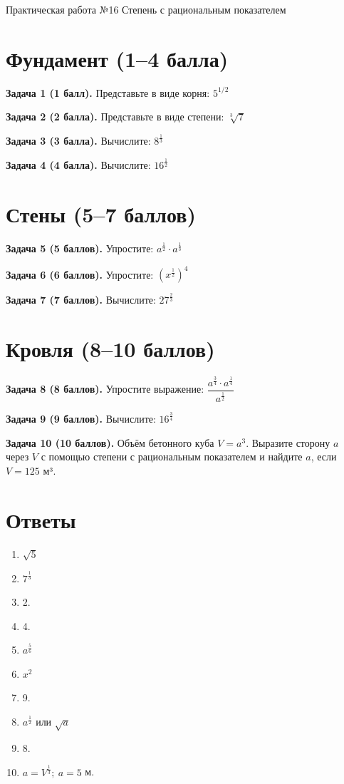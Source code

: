 \documentclass{umk-matematika}
\begin{document}
\maketitlepage
    {Практическая работа №16}
    {Степень с рациональным показателем}
    {}

\section{Фундамент (1--4 балла)}

\textbf{Задача 1 (1 балл).} Представьте в виде корня: $5^{1/2}$

\textbf{Задача 2 (2 балла).} Представьте в виде степени: $\sqrt[3]{7}$

\textbf{Задача 3 (3 балла).} Вычислите: $8^{\frac{1}{3}}$

\textbf{Задача 4 (4 балла).} Вычислите: $16^{\frac{1}{2}}$

\section{Стены (5--7 баллов)}

\textbf{Задача 5 (5 баллов).} Упростите: $a^{\frac{1}{2}} \cdot a^{\frac{1}{3}}$

\textbf{Задача 6 (6 баллов).} Упростите: $\left(x^{\frac{1}{2}}\right)^4$

\textbf{Задача 7 (7 баллов).} Вычислите: $27^{\frac{2}{3}}$

\section{Кровля (8--10 баллов)}

\textbf{Задача 8 (8 баллов).} Упростите выражение: $\dfrac{a^{\frac{3}{4}} \cdot a^{\frac{1}{4}}}{a^{\frac{1}{2}}}$

\textbf{Задача 9 (9 баллов).} Вычислите: $16^{\frac{3}{4}}$

\textbf{Задача 10 (10 баллов).} Объём бетонного куба $V = a^3$. Выразите сторону $a$ через $V$ с помощью степени с рациональным показателем и найдите $a$, если $V = 125$ м³.

\newpage
\section*{Ответы}

\begin{enumerate}
  \item $\sqrt{5}$
  \item $7^{\frac{1}{3}}$
  \item 2.
  \item 4.
  \item $a^{\frac{5}{6}}$
  \item $x^2$
  \item 9.
  \item $a^{\frac{1}{2}}$ или $\sqrt{a}$
  \item 8.
  \item $a = V^{\frac{1}{3}};\ a = 5$ м.
\end{enumerate}
\end{document}
